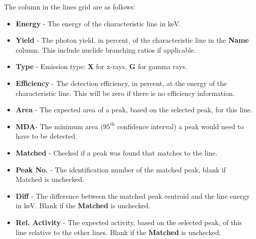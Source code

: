 \documentclass[12pt,report,justified]{SANDreport}
\begin{document}
The column in the lines grid are as follows:
\begin{itemize}
    \item \textbf{Energy} - The energy of the characteristic line in keV.
    \item \textbf{Yield} - The photon yield, in percent, of the characteristic line in the \textbf{Name} column. This include nuclide branching ratios if applicable.
    \item \textbf{Type} - Emission type: \textbf{X} for x-rays, \textbf{G} for gamma rays.
    \item \textbf{Efficiency} - The detection efficiency, in percent, at the energy of the characteristic line. This will be zero if there is no efficiency information.
    \item \textbf{Area} - The expected area of a peak, based on the selected peak, for this line.
    \item \textbf{MDA}- The minimum area (\(95^{\text{th}}\) confidence interval) a peak would need to have to be detected.
    \item \textbf{Matched} - Checked if a peak was found that matches to the line.
    \item \textbf{Peak No.} - The identification number of the matched peak, blank if Matched is unchecked.
    \item \textbf{Diff} - The difference between the matched peak centroid and the line energy in keV. Blank if the \textbf{Matched} is unchecked.
    \item \textbf{Rel. Activity} - The expected activity, based on the selected peak, of this line relative to the other lines. Blank if the \textbf{Matched} is unchecked.
\end{itemize}
\end{document}
